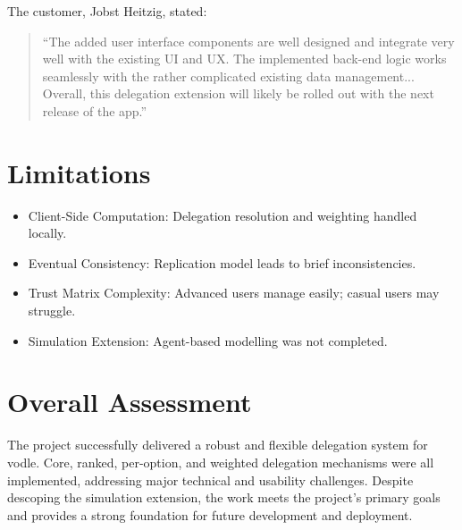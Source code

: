 The customer, Jobst Heitzig, stated:

\begin{quote}
``The added user interface components are well designed and integrate very well with the existing UI and UX. The implemented back-end logic works seamlessly with the rather complicated existing data management... Overall, this delegation extension will likely be rolled out with the next release of the app.''
\end{quote}

\section{Limitations}

\begin{itemize}
    \item Client-Side Computation: Delegation resolution and weighting handled locally.
    \item Eventual Consistency: Replication model leads to brief inconsistencies.
    \item Trust Matrix Complexity: Advanced users manage easily; casual users may struggle.
    \item Simulation Extension: Agent-based modelling was not completed.
\end{itemize}

\section{Overall Assessment}

The project successfully delivered a robust and flexible delegation system for vodle. Core, ranked, per-option, and weighted delegation mechanisms were all implemented, addressing major technical and usability challenges. Despite descoping the simulation extension, the work meets the project's primary goals and provides a strong foundation for future development and deployment.
